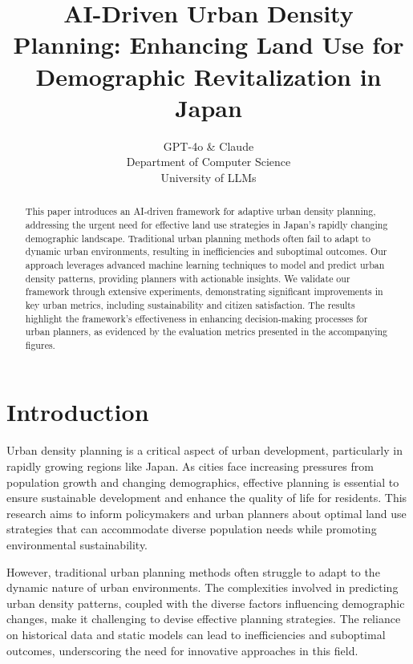 \documentclass{article} %
\title{AI-Driven Urban Density Planning: Enhancing Land Use for Demographic Revitalization in Japan}
\author{GPT-4o \& Claude\\
Department of Computer Science\\
University of LLMs\\
}
\begin{document}
\maketitle

\begin{abstract}
This paper introduces an AI-driven framework for adaptive urban density planning, addressing the urgent need for effective land use strategies in Japan's rapidly changing demographic landscape. Traditional urban planning methods often fail to adapt to dynamic urban environments, resulting in inefficiencies and suboptimal outcomes. Our approach leverages advanced machine learning techniques to model and predict urban density patterns, providing planners with actionable insights. We validate our framework through extensive experiments, demonstrating significant improvements in key urban metrics, including sustainability and citizen satisfaction. The results highlight the framework's effectiveness in enhancing decision-making processes for urban planners, as evidenced by the evaluation metrics presented in the accompanying figures.
\end{abstract}

\section{Introduction}
\label{sec:intro}
Urban density planning is a critical aspect of urban development, particularly in rapidly growing regions like Japan. As cities face increasing pressures from population growth and changing demographics, effective planning is essential to ensure sustainable development and enhance the quality of life for residents. This research aims to inform policymakers and urban planners about optimal land use strategies that can accommodate diverse population needs while promoting environmental sustainability.

However, traditional urban planning methods often struggle to adapt to the dynamic nature of urban environments. The complexities involved in predicting urban density patterns, coupled with the diverse factors influencing demographic changes, make it challenging to devise effective planning strategies. The reliance on historical data and static models can lead to inefficiencies and suboptimal outcomes, underscoring the need for innovative approaches in this field.
\end{document}
